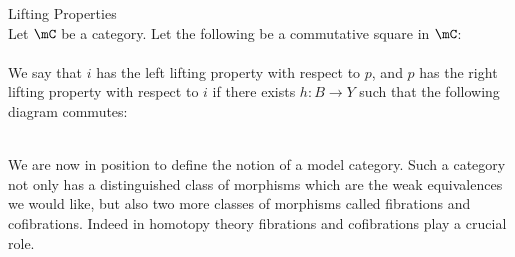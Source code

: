 \documentclass[a4paper]{article}
\begin{document}
\begin{defn}{Lifting Properties}{}\\ Let $\mC$ be a category. Let the following be a commutative square in $\mC$: \\
\\
We say that $i$ has the left lifting property with respect to $p$, and $p$ has the right lifting property with respect to $i$ if there exists $h:B\to Y$ such that the following diagram commutes: \\
\\
\end{defn}

We are now in position to define the notion of a model category. Such a category not only has a distinguished class of morphisms which are the weak equivalences we would like, but also two more classes of morphisms called fibrations and cofibrations. Indeed in homotopy theory fibrations and cofibrations play a crucial role. 
\end{document}
